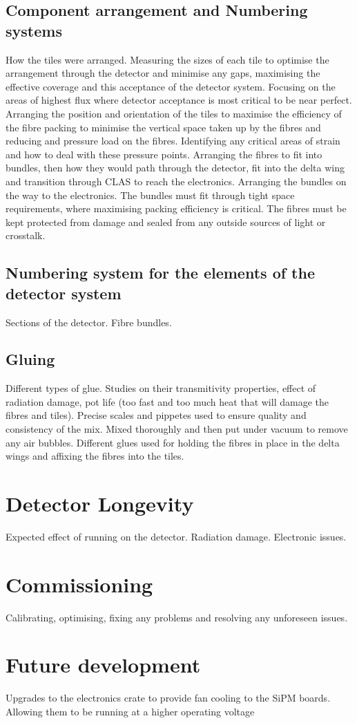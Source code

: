 \subsection{Component arrangement and Numbering systems}
How the tiles were arranged.
Measuring the sizes of each tile to optimise the arrangement through the detector and minimise any gaps, maximising the effective coverage and this acceptance of the detector system. Focusing on the areas of highest flux where detector acceptance is most critical to be near perfect.
Arranging the position and orientation of the tiles to maximise the efficiency of the fibre packing to minimise the vertical space taken up by the fibres and reducing and pressure load on the fibres. Identifying any critical areas of strain and how to deal with these pressure points.
Arranging the fibres to fit into bundles, then how they would path through the detector, fit into the delta wing and transition through CLAS to reach the electronics.
Arranging the bundles on the way to the electronics. The bundles must fit through tight space requirements, where maximising packing efficiency is critical. The fibres must be kept protected from damage and sealed from any outside sources of light or crosstalk.
\subsection{Numbering system for the elements of the detector system}
Sections of the detector.
Fibre bundles.
\subsection{Gluing} 
Different types of glue. Studies on their transmitivity properties, effect of radiation damage, pot life (too fast and too much heat that will damage the fibres and tiles).
Precise scales and pippetes used to ensure quality and consistency of the mix. Mixed thoroughly and then put under vacuum to remove any air bubbles.
Different glues used for holding the fibres in place in the delta wings and affixing the fibres into the tiles.
\section{Detector Longevity}
Expected effect of running on the detector.
Radiation damage.
Electronic issues.

\section{Commissioning}
Calibrating, optimising, fixing any problems and resolving any unforeseen issues.
\section{Future development}
Upgrades to the electronics crate to provide fan cooling to the SiPM boards. Allowing them to be running at a higher operating voltage 
